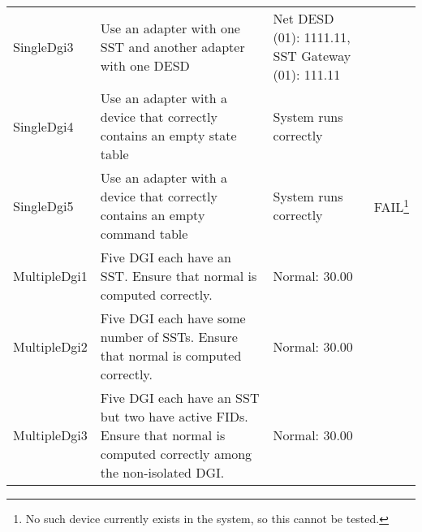 \documentclass{article}
\newcommand{\fail}[1]{\textcolor{BrickRed}{FAIL}\footnote{#1}}
\begin{document}
\begin{center}
\begin{footnotesize}
\begin{longtable}{|p{3cm}|p{7cm}|p{7cm}|c|}
    SingleDgi3 & Use an adapter with one SST and another adapter with one DESD & Net DESD (01): 1111.11, SST Gateway (01): 111.11 & \\
    SingleDgi4 & Use an adapter with a device that correctly contains an empty state table & System runs correctly & \\
    SingleDgi5 & Use an adapter with a device that correctly contains an empty command table & System runs correctly & \fail{No such device currently exists in the system, so this cannot be tested.} \\
    MultipleDgi1 & Five DGI each have an SST. Ensure that normal is computed correctly. & Normal: 30.00 & \\
    MultipleDgi2 & Five DGI each have some number of SSTs. Ensure that normal is computed correctly. & Normal: 30.00 & \\
    MultipleDgi3 & Five DGI each have an SST but two have active FIDs. Ensure that normal is computed correctly among the non-isolated DGI. & Normal: 30.00 & \\
\end{longtable}
\end{footnotesize}
\end{center}
\end{document}
